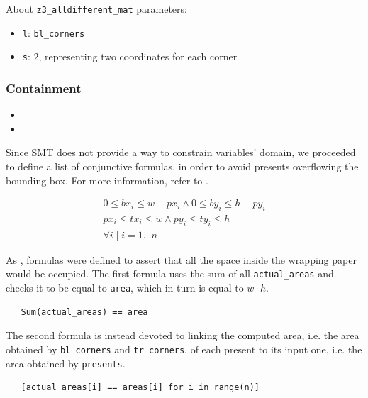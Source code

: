 \documentclass[a4paper,10pt]{article}
\newcounter{subsubsubsection}[subsubsection]
\begin{document}
About \texttt{z3\_alldifferent\_mat} parameters:
\begin{itemize}
   \item \texttt{l}: \texttt{bl\_corners}
   \item \texttt{s}: $2$, representing two coordinates for each corner
\end{itemize}

\subsubsection{Containment}
\begin{itemize}
   \item {}
   \item {}
\end{itemize}

 \label{sec:smt-reduce-presents-domains}
Since SMT does not provide a way to constrain variables' domain, we proceeded to define a list of conjunctive formulas, in order to avoid presents overflowing the bounding box. For more information, refer to .

\begin{gather*}
   0 \leq bx_{i} \leq w - px_{i} \wedge 0 \leq by_{i} \leq h - py_{i} \\
   px_{i} \leq tx_{i} \leq w \wedge py_{i} \leq ty_{i} \leq h \\
   \forall{i \mid i = 1 \dots n}
\end{gather*}

 \label{sec:smt-areas-summation}
As , formulas were defined to assert that all the space inside the wrapping paper would be occupied. The first formula uses the sum of all \texttt{actual\_areas} and checks it to be equal to \texttt{area}, which in turn is equal to $w \cdot h$.

\begin{verbatim}
   Sum(actual_areas) == area
\end{verbatim}

The second formula is instead devoted to linking the computed area, i.e. the area obtained by \texttt{bl\_corners} and \texttt{tr\_corners}, of each present to its input one, i.e. the area obtained by \texttt{presents}.

\begin{verbatim}
   [actual_areas[i] == areas[i] for i in range(n)]
\end{verbatim}
\end{document}
